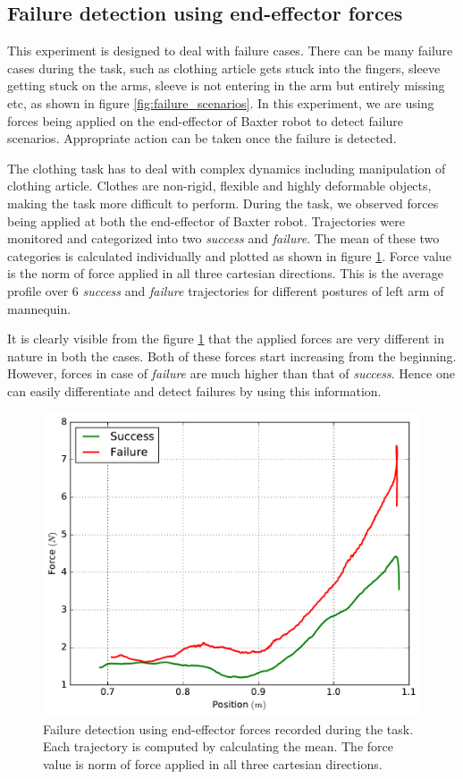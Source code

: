 \documentclass[sigconf]{acmart}
\begin{document}
\subsection{Failure detection using end-effector forces}
This experiment is designed to deal with failure cases. There can be many failure cases during the task, such as clothing article gets stuck into the fingers, sleeve getting stuck on the arms, sleeve is not entering in the arm but entirely missing etc, as shown in figure \ref{fig:failure_scenarios}. In this experiment, we are using forces being applied on the end-effector of Baxter robot to detect failure scenarios. Appropriate action can be taken once the failure is detected.

The clothing task has to deal with complex dynamics including manipulation of clothing article. Clothes are non-rigid, flexible and highly deformable objects, making the task more difficult to perform. During the task, we observed forces being applied at both the end-effector of Baxter robot. Trajectories were monitored and categorized into two \textit{success} and \textit{failure}. The mean of these two categories is calculated individually and plotted as shown in figure \ref{fig:position_force}. Force value is the norm of force applied in all three cartesian directions. This is the average profile over 6 \textit{success} and \textit{failure} trajectories for different postures of left arm of mannequin.

It is clearly visible from the figure \ref{fig:position_force} that the applied forces are very different in nature in both the cases. Both of these forces start increasing from the beginning. However, forces in case of \textit{failure} are much higher than that of \textit{success}. Hence one can easily differentiate and detect failures by using this information.

\begin{figure}
	\includegraphics[width=.9\linewidth]{position_force}
	\caption{Failure detection using end-effector forces recorded during the task. Each trajectory is computed by calculating the mean. The force value is norm of force applied in all three cartesian directions.}
	\label{fig:position_force}
\end{figure}
\end{document}
